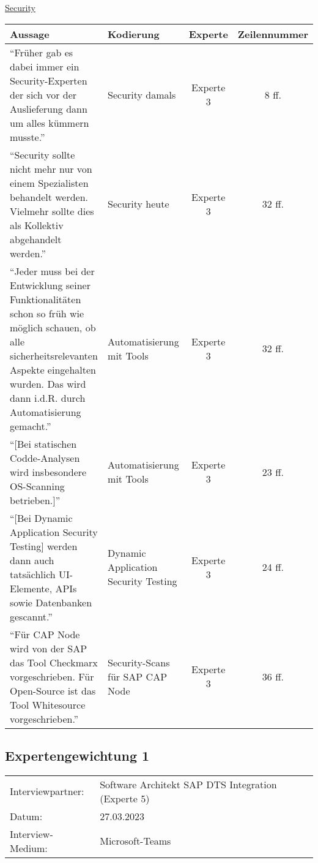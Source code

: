     \underline{Security}\\
    \begin{longtable}{ |C{6cm}|C{3cm}|c|c| }
        \hline
        Aussage & Kodierung & Experte & Zeilennummer\\
        \hline
        \enquote{Früher gab es dabei immer ein Security-Experten der sich vor der Auslieferung dann um alles kümmern musste.} & Security damals & Experte 3 & 8 ff. \\
        \hline
        \enquote{Security sollte nicht mehr nur von einem Spezialisten behandelt werden. Vielmehr sollte dies als Kollektiv abgehandelt werden.} & Security heute  & Experte 3 & 32 ff. \\
        \hline

        \enquote{Jeder muss bei der Entwicklung seiner Funktionalitäten schon so früh wie möglich schauen, ob alle sicherheitsrelevanten Aspekte eingehalten wurden. Das wird dann i.d.R. durch Automatisierung gemacht.} & Automatisierung mit Tools  & Experte 3 & 32 ff. \\
        \hline
        \enquote{[Bei statischen Codde-Analysen wird insbesondere OS-Scanning betrieben.]} & Automatisierung mit Tools  & Experte 3 & 23 ff. \\
        \hline
        \enquote{[Bei Dynamic Application Security Testing] werden dann auch tatsächlich UI-Elemente, APIs sowie Datenbanken gescannt.} & Dynamic Application Security Testing & Experte 3 & 24 ff. \\
        \hline
        \enquote{Für CAP Node wird von der SAP das Tool Checkmarx vorgeschrieben. Für Open-Source ist das Tool Whitesource vorgeschrieben.} & Security-Scans für SAP CAP Node  & Experte 3 & 36 ff. \\
        \hline
        \end{longtable}


        \newpage
        \subsection{Expertengewichtung 1}
                \begin{tabular}{ l l }
            Interviewpartner: & Software Architekt SAP DTS Integration (Experte 5)\\
            Datum: & 27.03.2023\\
            Interview-Medium: & Microsoft-Teams\\
    \end{tabular}
    \begin{center}
        \begin{figure}[H]
            \centering
            \label{fig:CEA}
        \end{figure}	
    \end{center}
    \begin{center}
        \begin{figure}[H]
            \centering
            \label{fig:CEA}
        \end{figure}	
    \end{center}

